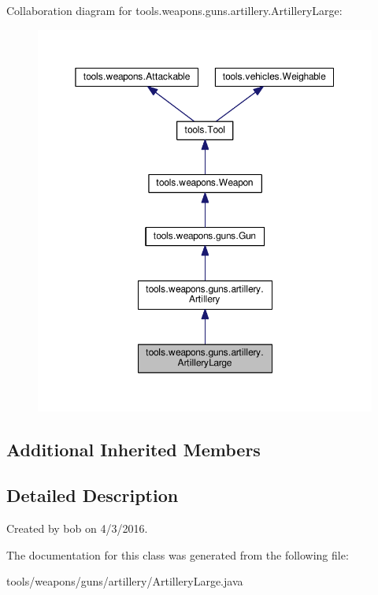 Collaboration diagram for tools.\+weapons.\+guns.\+artillery.\+Artillery\+Large\+:
\nopagebreak
\begin{figure}[H]
\begin{center}
\leavevmode
\includegraphics[width=350pt]{classtools_1_1weapons_1_1guns_1_1artillery_1_1_artillery_large__coll__graph}
\end{center}
\end{figure}
\subsection*{Additional Inherited Members}


\subsection{Detailed Description}
Created by bob on 4/3/2016. 

The documentation for this class was generated from the following file\+:\begin{DoxyCompactItemize}
\item 
tools/weapons/guns/artillery/Artillery\+Large.\+java\end{DoxyCompactItemize}
